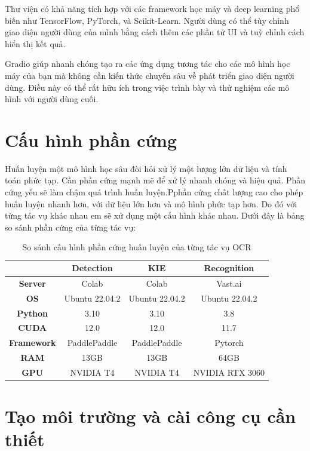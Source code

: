 Thư viện có khả năng tích hợp với các framework học máy và deep learning phổ biến như TensorFlow, PyTorch, và Scikit-Learn. Người dùng có thể tùy chỉnh giao diện người dùng của mình bằng cách thêm các phần tử UI và tuỳ chỉnh cách hiển thị kết quả.

Gradio giúp nhanh chóng tạo ra các ứng dụng tương tác cho các mô hình học máy của bạn mà không cần kiến thức chuyên sâu về phát triển giao diện người dùng. Điều này có thể rất hữu ích trong việc trình bày và thử nghiệm các mô hình với người dùng cuối.

\section{Cấu hình phần cứng}
Huấn luyện một mô hình học sâu đòi hỏi xử lý một lượng lớn dữ liệu và tính toán phức tạp. Cần phần cứng mạnh mẽ để xử lý nhanh chóng và hiệu quả. Phần cứng yếu sẽ làm chậm quá trình huấn luyện.Pphần cứng chất lượng cao cho phép huấn luyện nhanh hơn, với dữ liệu lớn hơn và mô hình phức tạp hơn. Do đó với từng tác vụ khác nhau em sẽ xử dụng một cấu hình khác nhau. Dưới đây là bảng so sánh phần cứng của từng tác vụ:

\begin{table}[h]
    \centering
    \begin{tabular}{| c | c | c | c |} 
     \hline
               & \textbf{Detection} & \textbf{KIE} & \textbf{Recognition} \\
     \hline\hline
     \textbf{Server}    & Colab & Colab & Vast.ai \\ 
     \textbf{OS}        & Ubuntu 22.04.2 & Ubuntu 22.04.2 & Ubuntu 22.04.2 \\
     \textbf{Python}    & 3.10 & 3.10 & 3.8 \\
     \textbf{CUDA}      & 12.0 & 12.0 & 11.7 \\
     \textbf{Framework} & PaddlePaddle & PaddlePaddle & Pytorch     \\
     \textbf{RAM}       & 13GB & 13GB & 64GB     \\
     \textbf{GPU}       & NVIDIA T4 & NVIDIA T4 & NVIDIA RTX 3060\\
     \hline
    \end{tabular}
    \caption{So sánh cấu hình phần cứng huấn luyện của từng tác vụ OCR}
    \label{table:hardward}
\end{table}

\section{Tạo môi trường và cài công cụ cần thiết}
